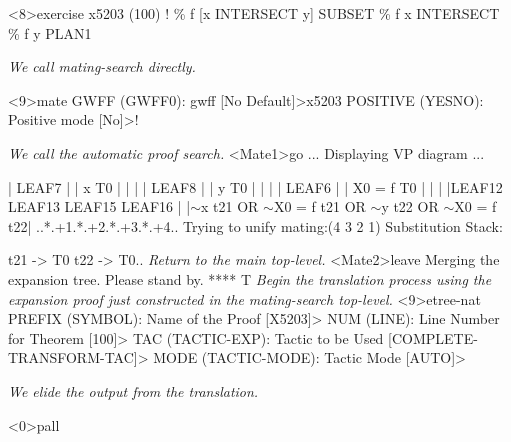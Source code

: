 \begin{tpsexample}
<8>exercise x5203
(100)        !  \% f [x INTERSECT y] SUBSET \% f x INTERSECT \% f y           PLAN1

{\it We call mating-search directly.}

<9>mate
GWFF (GWFF0): gwff [No Default]>x5203
POSITIVE (YESNO): Positive mode [No]>!

{\it We call the automatic proof search.}
<Mate1>go
...
Displaying VP diagram ...

|                    LEAF7                     |
|                    x T0                      |
|                                              |
|                    LEAF8                     |
|                    y T0                      |
|                                              |
|                    LEAF6                     |
|                  X0 = f T0                   |
|                                              |
|LEAF12      LEAF13       LEAF15      LEAF16   |
|\(\sim\)x t21 OR \(\sim\)X0 = f t21 OR \(\sim\)y t22 OR \(\sim\)X0 = f t22| 
..*.+1.*.+2.*.+3.*.+4..
Trying to unify mating:(4 3 2 1)
Substitution Stack:

t21   ->   T0
t22   ->   T0..
{\it Return to the main top-level.}
<Mate2>leave
Merging the expansion tree.  Please stand by.
****
T
{\it Begin the translation process using the expansion proof just constructed
in the mating-search top-level.}
<9>etree-nat
PREFIX (SYMBOL): Name of the Proof [X5203]>
NUM (LINE): Line Number for Theorem [100]>
TAC (TACTIC-EXP): Tactic to be Used [COMPLETE-TRANSFORM-TAC]>
MODE (TACTIC-MODE): Tactic Mode [AUTO]>

{\it We elide the output from the translation.}

<0>pall


\end{tpsexample}
